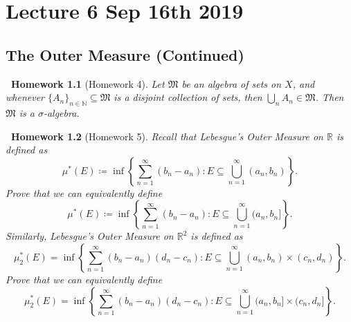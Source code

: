 \documentclass[notoc,notitlepage]{tufte-book}
\newtheorem*{homework}{\faCogs\ Homework}
\begin{document}

\chapter{Lecture 6 Sep 16th 2019}%
\label{chp:lecture_6_sep_16th_2019}

\section{The Outer Measure (Continued)}%
\label{sec:the_outer_measure_continued}

\begin{homework}[Homework 4]\label{homework:4}
  Let $\mathfrak{M}$ be an algebra of sets on $X$, and whenever
  $\{ A_n \}_{n \in \mathbb{N}} \subseteq \mathfrak{M}$ is a disjoint 
  collection of sets, then $\bigcup_{n} A_n \in \mathfrak{M}$.
  Then $\mathfrak{M}$ is a $\sigma$-algebra.
\end{homework}

\begin{homework}[Homework 5]\label{homework:5}
  Recall that Lebesgue's Outer Measure on $\mathbb{R}$ is defined as
  \begin{equation*}
    \mu^*(E) \coloneqq \inf \left\{ 
      \sum_{n=1}^{\infty} (b_n - a_n)
      : E \subseteq \bigcup_{n=1}^{\infty} (a_n, b_n)
    \right\}.
  \end{equation*}
  Prove that we can equivalently define
  \begin{equation*}
    \mu^*(E) \coloneqq \inf \left\{ 
      \sum_{n=1}^{\infty} (b_n - a_n)
      : E \subseteq \bigcup_{n=1}^{\infty} (a_n, b_n]
    \right\}.
  \end{equation*}
  Similarly, Lebesgue's Outer Measure on $\mathbb{R}^2$ is defined as
  \begin{equation*}
    \mu_2^*(E) = \inf \left\{ 
      \sum_{n=1}^{\infty} (b_n - a_n)(d_n - c_n)
      : E \subseteq \bigcup_{n=1}^{\infty} (a_n, b_n) \times (c_n, d_n)
    \right\}.
  \end{equation*}
  Prove that we can equivalently define
  \begin{equation*}
    \mu_2^*(E) = \inf \left\{ 
      \sum_{n=1}^{\infty} (b_n - a_n)(d_n - c_n)
      : E \subseteq \bigcup_{n=1}^{\infty} (a_n, b_n] \times (c_n, d_n]
    \right\}.
  \end{equation*}
\end{homework}
\end{document}
